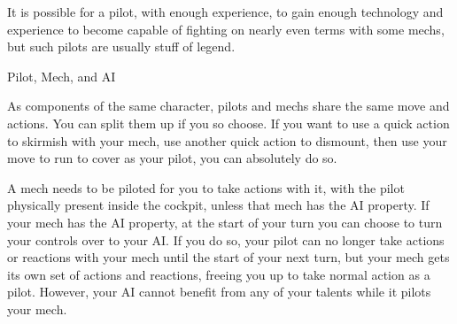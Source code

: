 It is possible for a pilot, with enough experience, to gain enough technology and experience to  
become capable of fighting on nearly even terms with some mechs, but such pilots are usually  
stuff of legend.  

                                                Pilot, Mech, and AI  

As components of the same character, pilots and mechs share the same move and actions. You  
can split them up if you so choose. If you want to use a quick action to skirmish with your mech,  
use another quick action to dismount, then use your move to run to cover as your pilot, you can  
absolutely do so.  

A mech needs to be piloted for you to take actions with it, with the pilot physically present inside  
the cockpit, unless that mech has the AI property. If your mech has the AI property, at the start of  
your turn you can choose to turn your controls over to your AI. If you do so, your pilot can no  
longer take actions or reactions with your mech until the start of your next turn, but your mech  
gets its own set of actions and reactions, freeing you up to take normal action as a pilot. However,  
your AI cannot benefit from any of your talents while it pilots your mech.  

                                                                                                                      
